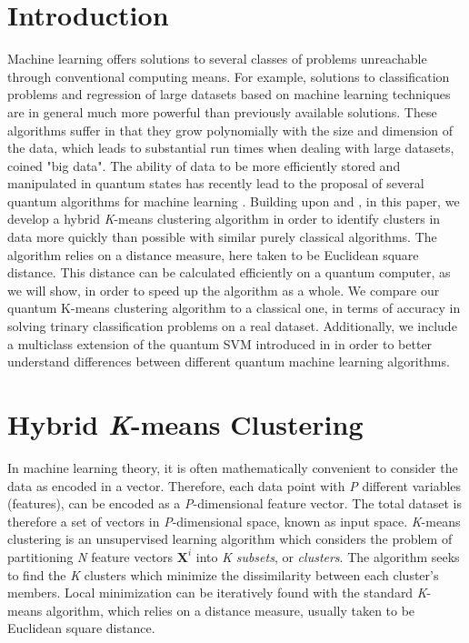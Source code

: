 \documentclass[twocolumn, english]{revtex4-2}
\begin{document}
\section{Introduction}
Machine learning offers solutions to several classes of problems unreachable through conventional computing means. For example, solutions to classification problems and regression of large datasets based on machine learning techniques are in general much more powerful than previously available solutions. These algorithms suffer in that they grow polynomially with the size and dimension of the data, which leads to substantial run times when dealing with large datasets, coined "big data". The ability of data to be more efficiently stored and manipulated in quantum states has recently lead to the proposal of several quantum algorithms for machine learning \cite{var_circ1, var_circ2, qml, autoencoders, feedforward, stevens, featureHilbertSpace, circuitcentric, lloydqsvm}. Building upon \cite{lloydlearning} and \cite{qmeans}, in this paper, we develop a hybrid \textit{K}-means clustering algorithm in order to identify clusters in data more quickly than possible with similar purely classical algorithms. The algorithm relies on a distance measure, here taken to be Euclidean square distance. This distance can be calculated efficiently on a quantum computer, as we will show, in order to speed up the algorithm as a whole. We compare our quantum K-means clustering algorithm to a classical one, in terms of accuracy in solving trinary classification problems on a real dataset. Additionally, we include a multiclass extension of the quantum SVM introduced in \cite{qsvm} in order to better understand differences between different quantum machine learning algorithms.

\section{Hybrid \textit{K}-means Clustering}

In machine learning theory, it is often mathematically convenient to consider the data as encoded in a vector. Therefore, each data point with \textit{P} different variables (features), can be encoded as a \textit{P}-dimensional feature vector. The total dataset is therefore a set of vectors in \textit{P}-dimensional space, known as input space. \textit{K}-means clustering is an unsupervised learning algorithm which considers the problem of partitioning \textit{N} feature vectors $\textbf{X}^{i}$ into \textit{K} \textit{subsets}, or \textit{clusters}. The algorithm seeks to find the \textit{K} clusters which minimize the dissimilarity between each cluster's members. Local minimization can be iteratively found with the standard \textit{K}-means algorithm, which relies on a distance measure, usually taken to be Euclidean square distance. 
\end{document}
